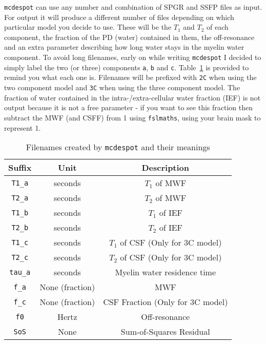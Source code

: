 \documentclass{report}
\begin{document}
\texttt{mcdespot} can use any number and combination of SPGR and SSFP files as input. For output it will produce a different number of files depending on which particular model you decide to use. These will be the $T_1$ and $T_2$ of each component, the fraction of the PD (water) contained in them, the off-resonance and an extra parameter describing how long water stays in the myelin water component. To avoid long filenames, early on while writing \texttt{mcdespot} I decided to simply label the two (or three) components \texttt{a}, \texttt{b} and \texttt{c}. Table~\ref{mcdespotfilenames} is provided to remind you what each one is. Filenames will be prefixed with \texttt{2C} when using the two component model and \texttt{3C} when using the three component model. The fraction of water contained in the intra-/extra-cellular water fraction (IEF) is not output because it is not a free parameter - if you want to see this fraction then subtract the MWF (and CSFF) from 1 using \texttt{fslmaths}, using your brain mask to represent 1.

\begin{table}\begin{center}
\begin{tabular}{c c c}
\hline
Suffix	& Unit	& Description\\
\hline
\texttt{T1\_a}	& seconds & $T_1$ of MWF \\
\texttt{T2\_a}	& seconds & $T_2$ of MWF \\
\texttt{T1\_b}	& seconds & $T_1$ of IEF \\
\texttt{T2\_b}	& seconds & $T_2$ of IEF \\
\texttt{T1\_c}	& seconds & $T_1$ of CSF (Only for 3C model) \\
\texttt{T2\_c}	& seconds & $T_2$ of CSF (Only for 3C model) \\
\texttt{tau\_a}	& seconds & Myelin water residence time \\
\texttt{f\_a}	& None (fraction) & MWF \\
\texttt{f\_c}	& None (fraction) & CSF Fraction (Only for 3C model) \\
\texttt{f0}		& Hertz   & Off-resonance \\
\texttt{SoS}	& None    & Sum-of-Squares Residual \\
\hline
\end{tabular}
\caption{Filenames created by \texttt{mcdespot} and their meanings}
\label{mcdespotfilenames}
\end{center}\end{table}	
\end{document}
